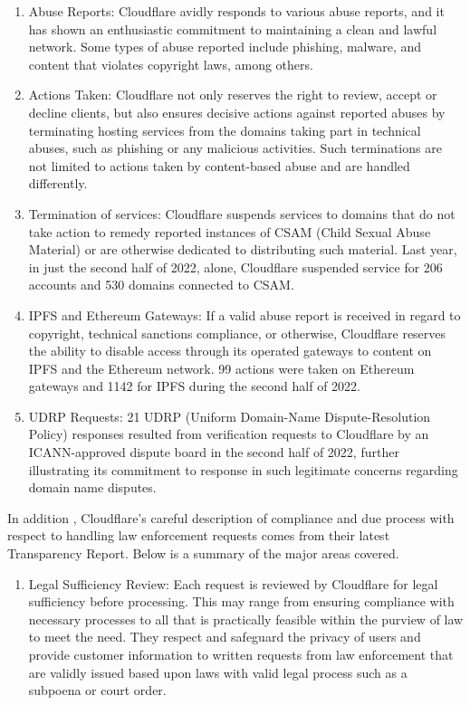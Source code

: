 \begin{enumerate}
\begin{enumerate}
    \item Abuse Reports: Cloudflare avidly responds to various abuse reports, and it has shown an enthusiastic commitment to maintaining a clean and lawful network. Some types of abuse reported include phishing, malware, and content that violates copyright laws, among others.
    \item Actions Taken: Cloudflare not only reserves the right to review, accept or decline clients, but also ensures decisive actions against reported abuses by terminating hosting services from the domains taking part in technical abuses, such as phishing or any malicious activities. Such terminations are not limited to actions taken by content-based abuse and are handled differently.
    \item Termination of services: Cloudflare suspends services to domains that do not take action to remedy reported instances of CSAM (Child Sexual Abuse Material) or are otherwise dedicated to distributing such material. Last year, in just the second half of 2022, alone, Cloudflare suspended service for 206 accounts and 530 domains connected to CSAM.
    \item IPFS and Ethereum Gateways: If a valid abuse report is received in regard to copyright, technical sanctions compliance, or otherwise, Cloudflare reserves the ability to disable access through its operated gateways to content on IPFS and the Ethereum network. 99 actions were taken on Ethereum gateways and 1142 for IPFS during the second half of 2022.
    \item UDRP Requests: 21 UDRP (Uniform Domain-Name Dispute-Resolution Policy) responses resulted from verification requests to Cloudflare by an ICANN-approved dispute board in the second half of 2022, further illustrating its commitment to response in such legitimate concerns regarding domain name disputes.
    
\end{enumerate}

In addition , Cloudflare's careful description of compliance and due process with respect to handling law enforcement requests comes from their latest Transparency Report.
Below is a summary of the major areas covered.

\begin{enumerate}
    \item Legal Sufficiency Review: Each request is reviewed by Cloudflare for legal sufficiency before processing. This may range from ensuring compliance with necessary processes to all that is practically feasible within the purview of law to meet the need. They respect and safeguard the privacy of users and provide customer information to written requests from law enforcement that are validly issued based upon laws with valid legal process such as a subpoena or court order.


\end{enumerate}
\end{enumerate}
